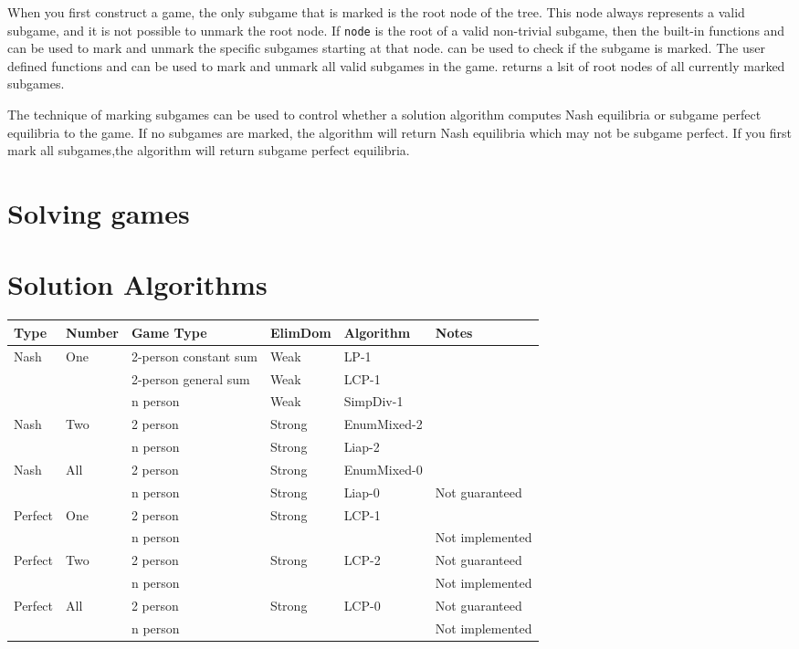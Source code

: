 When you first construct a game, the only subgame that is marked is
the root node of the tree.  This node always represents a valid
subgame, and it is not possible to unmark the root node.  If
\verb+node+ is the root of a valid non-trivial subgame, then the
built-in functions  and  can be
used to mark and unmark the specific subgames starting at that node.
 can be used to check if the subgame is marked.
The user defined functions  and
 can be used to mark and unmark all valid
subgames in the game.   returns a lsit of root
nodes of all currently marked subgames.

The technique of marking subgames can be used to control whether a
solution algorithm computes Nash equilibria or subgame perfect
equilibria to the game.  If no subgames are marked, the algorithm will
return Nash equilibria which may not be subgame perfect.  If you first
mark all subgames,the algorithm will return subgame perfect
equilibria.  

\section{Solving games}

\section{Solution Algorithms}

\begin{tabular}{|p{2cm}|p{2cm}|p{3cm}|p{2cm}|p{3cm}|l|}
Type & Number & Game Type & ElimDom & Algorithm & Notes \\
\hline
Nash & One    & 2-person constant sum &Weak & LP-1 & \\
     &        & 2-person general  sum &Weak & LCP-1& \\
     &        & n person              &Weak & SimpDiv-1 & \\
\hline
Nash & Two    & 2 person              &Strong & EnumMixed-2 &\\ 
     &        & n person              &Strong & Liap-2      & \\
\hline
Nash & All    & 2 person              &Strong & EnumMixed-0 &  \\
     &        & n person              &Strong & Liap-0      & Not guaranteed\\
\hline
\hline
Perfect & One    & 2 person           &Strong & LCP-1    & \\
     &           & n person              &       &     &Not implemented  \\
\hline
Perfect & Two    & 2 person              &Strong & LCP-2 & Not guaranteed \\
     &           & n person              &       &     & Not implemented \\
\hline
Perfect & All    & 2 person              &Strong & LCP-0 & Not guaranteed \\
     &           & n person              &       &     & Not implemented\\
\hline
\end{tabular}


